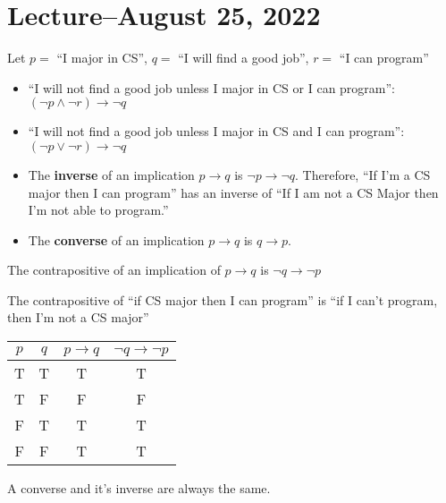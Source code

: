\documentclass[8pt]{scrreprt}
\begin{document}
\section{Lecture--August 25, 2022}

Let $p=$ ``I major in CS'', $q=$ ``I will find a good job'', $r=$ ``I can program''

\begin{itemize}

	\item ``I will not find a good job unless I major in CS or I can program'': $(\neg p \land \neg r)\rightarrow \neg q$

	\item ``I will not find a good job unless I major in CS and I can program'': $(\neg p \lor \neg r)\rightarrow \neg q$

	\item The \textbf{inverse} of an implication $p\rightarrow q$ is $\neg p\rightarrow \neg q$.
	      Therefore, ``If I'm a CS major then I can program'' has an inverse of
	      ``If I am not a CS Major then I'm not able to program.''

	\item The \textbf{converse} of an implication $p\rightarrow q$ is $q\rightarrow p$.

\end{itemize}

\begin{definition}[Contrapositive]
	The contrapositive of an implication of $p\rightarrow q$ is $\neg q\rightarrow \neg p$

	The contrapositive of ``if CS major then I can program'' is ``if I can't program, then I'm not a CS major''

	\begin{tabular}{|c|c|c|c|}
		\hline
		$p$ & $q$ & $p\rightarrow q$ & $\neg q\rightarrow \neg p$ \\
		\hline
		T   & T   & T                & T                          \\
		T   & F   & F                & F                          \\
		F   & T   & T                & T                          \\
		F   & F   & T                & T                          \\
		\hline
	\end{tabular}

	A converse and it's inverse are always the same.

\end{definition}
\end{document}
